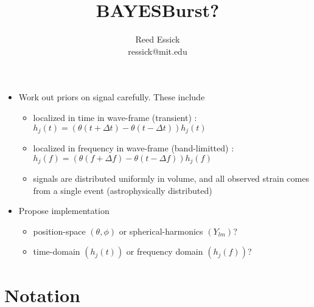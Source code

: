 \documentclass[10pt]{article}
\begin{document}

\title{BAYESBurst?}
\author{Reed Essick\\ressick@mit.edu}
\maketitle


\begin{itemize}
	\item{Work out priors on signal carefully. These include 
		\begin{itemize}
			\item{localized in time in wave-frame (transient) : $h_j(t) = \left(\theta(t+\Delta t) - \theta(t-\Delta t)\right) h_j(t)$}
			\item{localized in frequency in wave-frame (band-limitted) : $h_j(f) = \left(\theta(f+\Delta f) - \theta(t-\Delta f)\right) h_j(f)$}
			\item{signals are distributed uniformly in volume, and all observed strain comes from a single event (astrophysically distributed)}
		\end{itemize}
	     }
	\item{Propose implementation
		\begin{itemize}
			\item{position-space $(\theta, \phi)$ or spherical-harmonics $(Y_{lm})$?}
			\item{time-domain $(h_j(t))$ or frequency domain $(h_j(f))$?}
		\end{itemize}
	     }
\end{itemize}

\thispagestyle{empty}
\tableofcontents
\newpage


\section{Notation}
\end{document}
